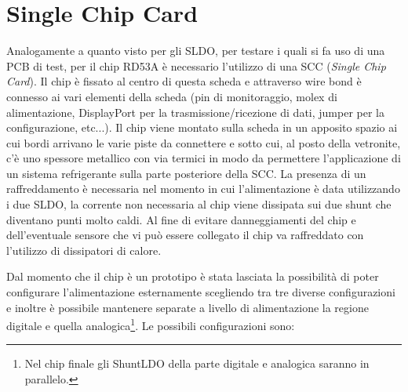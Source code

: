 \section{Single Chip Card}
Analogamente a quanto visto per gli SLDO, per  testare i quali si fa uso di una PCB di test, per il chip RD53A è necessario l'utilizzo di una SCC (\textit{Single Chip Card}). 
Il chip è fissato al centro di questa scheda e attraverso wire bond è connesso ai vari elementi della scheda (pin di monitoraggio, molex di alimentazione, DisplayPort per la trasmissione/ricezione di dati, jumper per la configurazione, etc...). 
Il chip viene montato sulla scheda in un apposito spazio ai cui bordi arrivano le varie piste da connettere e sotto cui, al posto della vetronite, c'è uno spessore metallico con via termici in modo da permettere l'applicazione di un sistema refrigerante sulla parte posteriore della SCC. 
La presenza di un raffreddamento è necessaria nel momento in cui l'alimentazione è data utilizzando i due SLDO, la corrente non necessaria al chip viene dissipata sui due shunt che diventano punti molto caldi. 
Al fine di evitare danneggiamenti del chip e dell'eventuale sensore che vi può essere collegato il chip va raffreddato con l'utilizzo di dissipatori di calore. 

Dal momento che il chip è un prototipo è stata lasciata la possibilità di poter configurare l'alimentazione esternamente scegliendo tra tre diverse configurazioni e inoltre è possibile mantenere separate a livello di alimentazione la regione digitale e quella analogica\footnote{Nel chip finale gli ShuntLDO della parte digitale e analogica saranno in parallelo.}.
Le possibili configurazioni sono:



